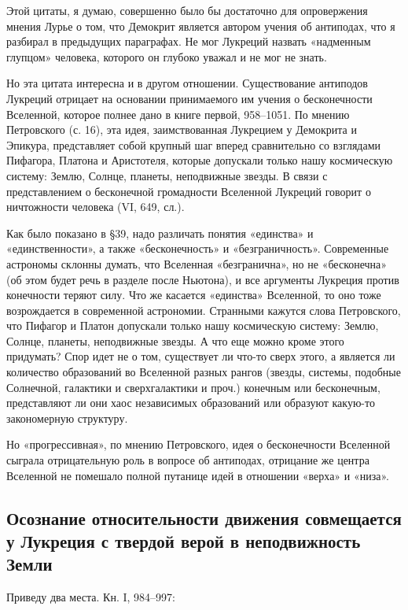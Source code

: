 Этой цитаты, я  думаю, совершенно было бы  достаточно для опровержения
мнения Лурье о том, что Демокрит является автором учения об антиподах,
что  я  разбирал в  предыдущих  параграфах.  Не мог  Лукреций  назвать
«надменным глупцом» человека,  которого он глубоко уважал и  не мог не
знать.

Но эта цитата интересна и  в другом отношении. Существование антиподов
Лукреций отрицает на основании  принимаемого им учения о бесконечности
Вселенной, которое  полнее дано в  книге первой, 958--1051.  По мнению
Петровского (с.  16), эта  идея, заимствованная Лукрецием  у Демокрита
и  Эпикура,  представляет собой  крупный  шаг  вперед сравнительно  со
взглядами  Пифагора, Платона  и Аристотеля,  которые допускали  только
нашу космическую систему: Землю,  Солнце, планеты, неподвижные звезды.
В связи с представлением  о бесконечной громадности Вселенной Лукреций
говорит о ничтожности человека (VI, 649, сл.).

Как  было  показано  в  §39,   надо  различать  понятия  «единства»  и
«единственности»,   а   также  «бесконечность»   и   «безграничность».
Современные астрономы склонны думать,  что Вселенная «безгранична», но
не  «бесконечна»  (об  этом  будет  речь  в  разделе  после  Ньютона),
и  все  аргументы  Лукреция  против конечности  теряют  силу.  Что  же
касается «единства» Вселенной, то  оно тоже возрождается в современной
астрономии. Странными кажутся слова  Петровского, что Пифагор и Платон
допускали  только нашу  космическую систему:  Землю, Солнце,  планеты,
неподвижные  звезды.  А что  еще  можно  кроме этого  придумать?  Спор
идет  не о  том,  существует  ли что-то  сверх  этого,  а является  ли
количество образований  во Вселенной  разных рангов  (звезды, системы,
подобные Солнечной,  галактики и сверхгалактики и  проч.) конечным или
бесконечным,  представляют ли  они  хаос  независимых образований  или
образуют какую-то закономерную структуру.

Но  «прогрессивная»,  по  мнению  Петровского,  идея  о  бесконечности
Вселенной сыграла отрицательную роль в вопросе об антиподах, отрицание
же  центра Вселенной  не  помешало полной  путанице  идей в  отношении
«верха» и «низа».

\subsection{Осознание относительности движения  совмещается у Лукреция
с твердой верой в неподвижность Земли}

Приведу два места. Кн. I, 984--997:

